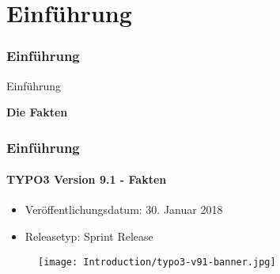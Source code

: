 %

\section{Einführung}
\begin{frame}[fragile]
	\frametitle{Einführung}

	\begin{center}\huge{Einführung}\end{center}
	\begin{center}\huge{\color{typo3darkgrey}\textbf{Die Fakten}}\end{center}

\end{frame}

\begin{frame}[fragile]
	\frametitle{Einführung}
	\framesubtitle{TYPO3 Version 9.1 - Fakten}

	\begin{itemize}
		\item Veröffentlichungsdatum: 30. Januar 2018
		\item Releasetyp: Sprint Release
	\end{itemize}

	\begin{figure}
		\texttt{[image: Introduction/typo3-v91-banner.jpg]}
	\end{figure}

\end{frame}

